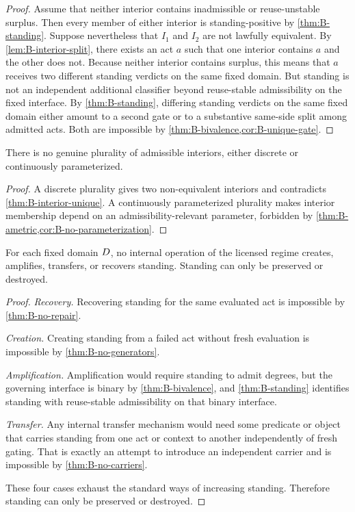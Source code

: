 \begin{proof}
Assume that neither interior contains inadmissible or reuse-unstable surplus. Then every member of either interior is standing-positive by \cref{thm:B-standing}. Suppose nevertheless that $I_1$ and $I_2$ are not lawfully equivalent. By \cref{lem:B-interior-split}, there exists an act $a$ such that one interior contains $a$ and the other does not. Because neither interior contains surplus, this means that $a$ receives two different standing verdicts on the same fixed domain. But standing is not an independent additional classifier beyond reuse-stable admissibility on the fixed interface. By \cref{thm:B-standing}, differing standing verdicts on the same fixed domain either amount to a second gate or to a substantive same-side split among admitted acts. Both are impossible by \cref{thm:B-bivalence,cor:B-unique-gate}.
\end{proof}

\begin{corollary}
\label{cor:B-no-plural}
There is no genuine plurality of admissible interiors, either discrete or continuously parameterized.
\end{corollary}

\begin{proof}
A discrete plurality gives two non-equivalent interiors and contradicts \cref{thm:B-interior-unique}. A continuously parameterized plurality makes interior membership depend on an admissibility-relevant parameter, forbidden by \cref{thm:B-ametric,cor:B-no-parameterization}.
\end{proof}

\begin{theorem}
\label{thm:B-conservation}
For each fixed domain $D$, no internal operation of the licensed regime creates, amplifies, transfers, or recovers standing. Standing can only be preserved or destroyed.
\end{theorem}

\begin{proof}
\emph{Recovery.} Recovering standing for the same evaluated act is impossible by \cref{thm:B-no-repair}.

\emph{Creation.} Creating standing from a failed act without fresh evaluation is impossible by \cref{thm:B-no-generators}.

\emph{Amplification.} Amplification would require standing to admit degrees, but the governing interface is binary by \cref{thm:B-bivalence}, and \cref{thm:B-standing} identifies standing with reuse-stable admissibility on that binary interface.

\emph{Transfer.} Any internal transfer mechanism would need some predicate or object that carries standing from one act or context to another independently of fresh gating. That is exactly an attempt to introduce an independent carrier and is impossible by \cref{thm:B-no-carriers}.

These four cases exhaust the standard ways of increasing standing. Therefore standing can only be preserved or destroyed.
\end{proof}

